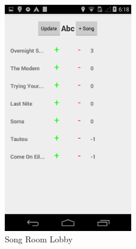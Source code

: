 \documentclass[12pt]{article}
\begin{document}
\begin{figure}[h]
  \centering
    \includegraphics[width=0.5\textwidth]{in-sr}
    \caption{Song Room Lobby}
\end{figure}
\end{document}
